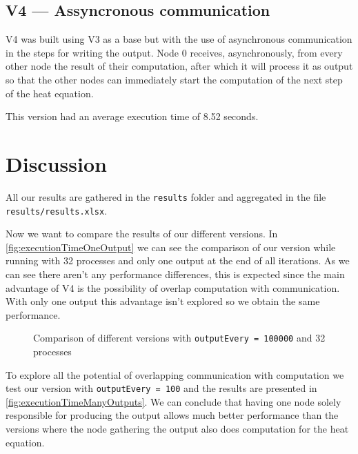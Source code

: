 \documentclass[conference]{IEEEtran}
\begin{document}
\subsection{V4 --- Assyncronous communication}
V4 was built using V3 as a base but with the use of asynchronous communication in the steps for writing the output. Node 0 receives, asynchronously, from every other node the result of their computation, after which it will process it as output so that the other nodes can immediately start the computation of the next step of the heat equation.

This version had an average execution time of 8.52 seconds.


\section{Discussion}

All our results are gathered in the \texttt{results} folder and aggregated in the file \texttt{results/results.xlsx}.

Now we want to compare the results of our different versions. In \autoref{fig:executionTimeOneOutput} we can see the comparison of our version while running with 32 processes and only one output at the end of all iterations. As we can see there aren't any performance differences, this is expected since the main advantage of V4 is the possibility of overlap computation with communication. With only one output this advantage isn't explored so we obtain the same performance.

\begin{figure}[ht]
  \centering
  \caption{Comparison of different versions with \texttt{outputEvery = 100000} and 32 processes}
  \label{fig:executionTimeOneOutput}
\end{figure}

To explore all the potential of overlapping communication with computation we test our version with
\texttt{outputEvery = 100} and the results are presented in \autoref{fig:executionTimeManyOutputs}.
We can conclude that having one node solely responsible for producing the output allows much better performance than the versions where the node gathering the output also does computation for the heat equation.
\end{document}
